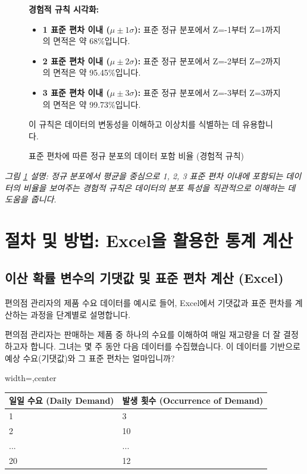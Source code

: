 \documentclass[11pt,a4paper]{article}
\theoremstyle{definition}
\begin{document}
\begin{figure}[h!]
    \centering
    \begin{tcolorbox}[colback=white, colframe=black, title=\textbf{표준 편차에 따른 정규 분포의 데이터 포함 비율}]
    \textbf{경험적 규칙 시각화:}
    \begin{itemize}
        \item \textbf{1 표준 편차 이내 ($\mu \pm 1\sigma$):} 표준 정규 분포에서 Z=-1부터 Z=1까지의 면적은 약 68\%입니다.
        \item \textbf{2 표준 편차 이내 ($\mu \pm 2\sigma$):} 표준 정규 분포에서 Z=-2부터 Z=2까지의 면적은 약 95.45\%입니다.
        \item \textbf{3 표준 편차 이내 ($\mu \pm 3\sigma$):} 표준 정규 분포에서 Z=-3부터 Z=3까지의 면적은 약 99.73\%입니다.
    \end{itemize}
    이 규칙은 데이터의 변동성을 이해하고 이상치를 식별하는 데 유용합니다.
    \end{tcolorbox}
    \caption{표준 편차에 따른 정규 분포의 데이터 포함 비율 (경험적 규칙)}
    \label{fig:empirical_rule}
\end{figure}
\textit{그림 \ref{fig:empirical_rule} 설명: 정규 분포에서 평균을 중심으로 1, 2, 3 표준 편차 이내에 포함되는 데이터의 비율을 보여주는 경험적 규칙은 데이터의 분포 특성을 직관적으로 이해하는 데 도움을 줍니다.}

\newpage
\section{절차 및 방법: Excel을 활용한 통계 계산}

\subsection{이산 확률 변수의 기댓값 및 표준 편차 계산 (Excel)}
편의점 관리자의 제품 수요 데이터를 예시로 들어, Excel에서 기댓값과 표준 편차를 계산하는 과정을 단계별로 설명합니다.

\begin{examplebox}[문제 상황]
편의점 관리자는 판매하는 제품 중 하나의 수요를 이해하여 매일 재고량을 더 잘 결정하고자 합니다. 그녀는 몇 주 동안 다음 데이터를 수집했습니다. 이 데이터를 기반으로 예상 수요(기댓값)와 그 표준 편차는 얼마입니까?
\end{examplebox}

\begin{adjustbox}{width=\textwidth,center}
\begin{tabular}{ll}
\toprule
\textbf{일일 수요 (Daily Demand)} & \textbf{발생 횟수 (Occurrence of Demand)} \\
\midrule
1 & 3 \\
2 & 10 \\
... & ... \\
20 & 12 \\
\bottomrule
\end{tabular}
\end{adjustbox}
\label{tab:demand_data}
\end{document}
